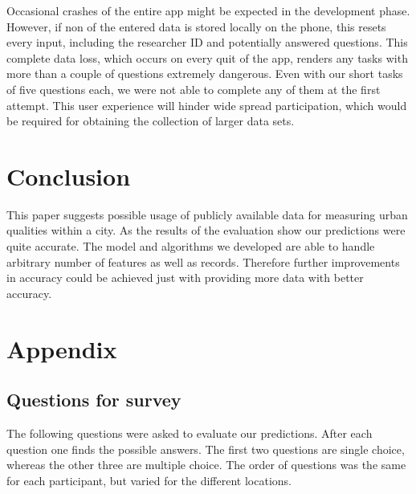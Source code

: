 \documentclass[letterpaper]{article}
\begin{document}
\indent Occasional crashes of the entire app might be expected in the development phase. However, if non of the entered data
is stored locally on the phone, this resets every input, including the researcher ID and potentially answered questions.
This complete data loss, which occurs on every quit of the app, renders any tasks with more than a couple of questions extremely dangerous.
Even with our short tasks of five questions each, we were not able to complete any of them at the first attempt. This user experience will
hinder wide spread participation, which would be required for obtaining the collection of larger data sets.

\section{Conclusion}
This paper suggests possible usage of publicly available data for measuring urban qualities within a city.
As the results of the evaluation show our predictions were quite accurate. The model and algorithms we developed
are able to handle arbitrary number of features as well as records. Therefore further improvements in accuracy
could be achieved just with providing more data with better accuracy.  




\newpage
\section{Appendix}
\subsection{Questions for survey}\label{app:questions}
The following questions were asked to evaluate our predictions. After each question one finds the possible answers.
The first two questions are single choice, whereas the other three are multiple choice.
The order of questions was the same for each participant, but varied for the different locations.
\end{document}
